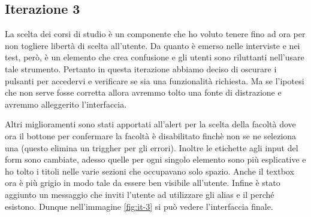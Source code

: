 \documentclass[Lau, oneside, noexaminfo]{sapthesis}%
\begin{document}
\subsection{Iterazione 3}
La scelta dei corsi di studio è un componente che ho voluto tenere fino ad ora per non togliere libertà di scelta all'utente. Da quanto è emerso nelle interviste e nei test, però, è un elemento che crea confusione e gli utenti sono riluttanti nell'usare tale strumento. Pertanto in questa iterazione abbiamo deciso di oscurare i pulsanti per accedervi e verificare se sia una funzionalità richiesta. Ma se l'ipotesi che non serve fosse corretta allora avremmo tolto una fonte di distrazione e avremmo alleggerito l'interfaccia.

Altri miglioramenti sono stati apportati all'alert per la scelta della facoltà dove ora il bottone per confermare la facoltà è disabilitato finchè non se ne seleziona una (questo elimina un triggher per gli errori). Inoltre le etichette agli input del form sono cambiate, adesso quelle per ogni singolo elemento sono più esplicative e ho tolto i titoli nelle varie sezioni che occupavano solo spazio. Anche il textbox ora è più grigio in modo tale da essere ben visibile all'utente. Infine è stato aggiunto un messaggio che inviti l'utente ad utilizzare gli alias e il perché esistono. Dunque nell'immagine \ref{fig:it-3} si può vedere l'interfaccia finale.
\end{document}
